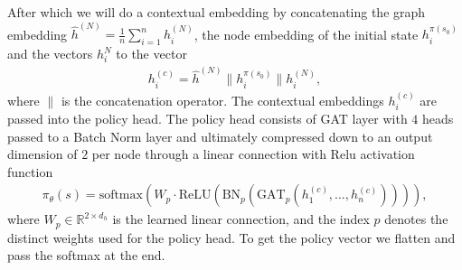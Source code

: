 After which we will do a contextual embedding by concatenating the graph
embedding $\hat{h}^{(N)} = \frac{1}{n}\sum_{i=1}^{n} h_i^{(N)}$, the node
embedding of the initial state $h^{\pi(s_0)}_i$ and the vectors $h_i^{N}$ to
the vector
\begin{align}
    h^{(c)}_i = \hat{h}^{(N)} \|  h^{\pi(s_0)}_i \| h_i^{(N)},
\end{align}
where $\|$ is the concatenation operator. The contextual embeddings
$h^{(c)}_i$ are passed into the policy head. The policy head consists of
GAT layer with $4$ heads passed to a Batch Norm layer and ultimately
compressed down to an output dimension of $2$ per node through a linear
connection with Relu activation function
\begin{align}
    \pi_\theta(s) = \text{softmax}\left(   W_p \cdot
    \text{ReLU}\left(\text{BN}_p(\text{GAT}_p(h^{(c)}_1,\ldots,h^{(c)}_n))\right)\right),
\end{align}
where $W_p \in \mathbb{R}^{2\times d_h}$ is the learned linear connection,
and the index $p$ denotes the distinct weights used for the policy head. To
get the policy vector we flatten and pass the softmax at the end.


